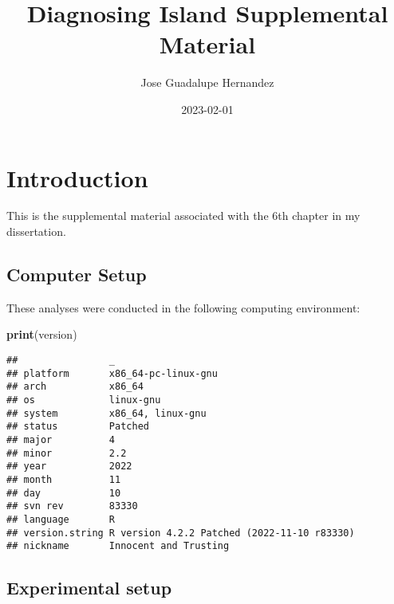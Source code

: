 \documentclass[]{book}
\title{Diagnosing Island Supplemental Material}
\author{Jose Guadalupe Hernandez}
\date{2023-02-01}
\newenvironment{Shaded}{\begin{snugshade}}{\end{snugshade}}
\newcommand{\KeywordTok}[1]{\textcolor[rgb]{0.13,0.29,0.53}{\textbf{#1}}}
\newcommand{\NormalTok}[1]{#1}
\begin{document}
\maketitle

{
\setcounter{tocdepth}{1}
\tableofcontents
}
\hypertarget{introduction}{%
\chapter{Introduction}\label{introduction}}

This is the supplemental material associated with the 6th chapter in my dissertation.

\hypertarget{computer-setup}{%
\section{Computer Setup}\label{computer-setup}}

These analyses were conducted in the following computing environment:

\begin{Shaded}
\begin{Highlighting}[]
\KeywordTok{print}\NormalTok{(version)}
\end{Highlighting}
\end{Shaded}

\begin{verbatim}
##                _                                          
## platform       x86_64-pc-linux-gnu                        
## arch           x86_64                                     
## os             linux-gnu                                  
## system         x86_64, linux-gnu                          
## status         Patched                                    
## major          4                                          
## minor          2.2                                        
## year           2022                                       
## month          11                                         
## day            10                                         
## svn rev        83330                                      
## language       R                                          
## version.string R version 4.2.2 Patched (2022-11-10 r83330)
## nickname       Innocent and Trusting
\end{verbatim}

\hypertarget{experimental-setup}{%
\section{Experimental setup}\label{experimental-setup}}
\end{document}
